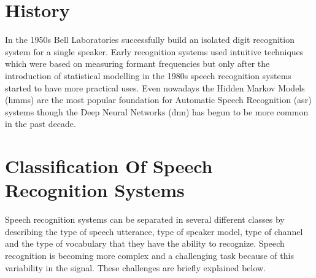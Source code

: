 \documentclass[12pt, a4paper, twoside]{report}
\begin{document}
\section{History}
In the 1950s Bell Laboratories successfully build an isolated digit recognition system for a single speaker. Early recognition systems used intuitive techniques which were based on measuring formant frequencies but only after the introduction of statistical modelling in the 1980s speech recognition systems started to have more practical uses. Even nowadays the Hidden Markov Models (\acrshort{hmm}s) are the most popular foundation for Automatic Speech Recognition (\acrshort{asr}) systems though the Deep Neural Networks (\acrshort{dnn}) has begun to be more common in the past decade.
\section{Classification Of Speech Recognition Systems}
Speech recognition systems can be separated in several different classes by describing the type of speech utterance, type of speaker model, type of channel and the type of vocabulary that they have the ability to recognize. Speech recognition is becoming more complex and a challenging task because of this variability in the signal. These challenges are briefly explained below.
\end{document}
